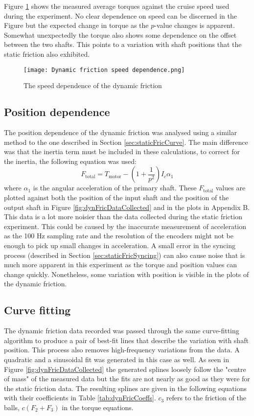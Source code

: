 \documentclass[12pt]{article}
\begin{document}
Figure \ref{fig:dynamicFrictionSpeedDependence} shows the measured average torques against the cruise speed used during the experiment. No clear dependence on speed can be discerned in the Figure but the expected change in torque as the $p$-value changes is apparent. Somewhat unexpectedly the torque also shows some dependence on the offset between the two shafts. This points to a variation with shaft positions that the static friction also exhibited. 

\begin{figure}
    \centering
    \texttt{[image: Dynamic friction speed dependence.png]}
    \caption{The speed dependence of the dynamic friction}
    \label{fig:dynamicFrictionSpeedDependence}
\end{figure}


\subsection{Position dependence}
The position dependence of the dynamic friction was analysed using a similar method to the one described in Section \ref{sec:staticFricCurve}. The main difference was that the inertia term must be included in these calculations, to correct for the inertia, the following equation was used:\\
$$F_{\text{total}} = T_{\text{motor}}- \left(1+\frac{1}{p^2}\right)I_c\alpha_1 $$
where $\alpha_1$ is the angular acceleration of the primary shaft. These $F_{\text{total}}$ values are plotted against both the position of the input shaft and the position of the output shaft in Figure \ref{fig:dynFricDataCollected} and in the plots in Appendix B. This data is a lot more noisier than the data collected during the static friction experiment. This could be caused by the inaccurate measurement of acceleration as the 100 Hz sampling rate and the resolution of the encoders might not be enough to pick up small changes in acceleration. A small error in the syncing process (described in Section \ref{sec:staticFricSyncing}) can also cause noise that is much more apparent in this experiment as the torque and position values can change quickly. Nonetheless, some variation with position is visible in the plots of the dynamic friction.\\


\subsection{Curve fitting}
The dynamic friction data recorded was passed through the same curve-fitting algorithm to produce a pair of best-fit lines that describe the variation with shaft position. This process also removes high-frequency variations from the data. A quadratic and a sinusoidal fit was generated in this case as well. As seen in Figure \ref{fig:dynFricDataCollected} the generated splines loosely follow the "centre of mass" of the measured data but the fits are not nearly as good as they were for the static friction data. The resulting splines are given in the following equations with their coefficients in Table \ref{tab:dynFricCoeffs}. $c_3$ refers to the friction of the balls, $c(F_2+F_3)$ in the torque equations.
\end{document}
